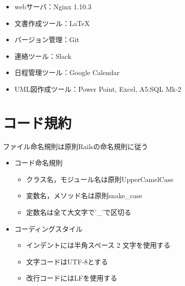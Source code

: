 \begin{itemize}
\item webサーバ：Nginx 1.10.3

\item 文書作成ツール：LaTeX

\item バージョン管理：Git

\item 連絡ツール：Slack

\item 日程管理ツール：Google Calendar

\item UML図作成ツール：Power Point, Excel, A5:SQL Mk-2

\end{itemize}

\section{コード規約}
ファイル命名規則は原則Railsの命名規則に従う

\begin{itemize}
\item コード命名規則
  \begin{itemize}
  \item クラス名，モジュール名は原則UpperCamelCase
  \item 変数名，メソッド名は原則snake\_case
  \item 定数名は全て大文字で'\_'で区切る
\end{itemize}
\item コーディングスタイル
\begin{itemize}
  \item インデントには半角スペース 2 文字を使用する
  \item 文字コードはUTF-8とする
  \item 改行コードにはLFを使用する
  \end{itemize}
\end{itemize}
